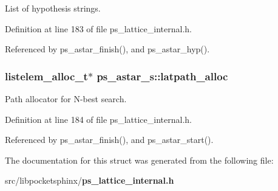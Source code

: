List of hypothesis strings. 



Definition at line 183 of file ps\+\_\+lattice\+\_\+internal.\+h.



Referenced by ps\+\_\+astar\+\_\+finish(), and ps\+\_\+astar\+\_\+hyp().

\subsubsection[{latpath\+\_\+alloc}]{\setlength{\rightskip}{0pt plus 5cm}listelem\+\_\+alloc\+\_\+t$\ast$ ps\+\_\+astar\+\_\+s\+::latpath\+\_\+alloc}\label{structps__astar__s_a754bce124cd92b1b2b6aa6dbbcd73cee}


Path allocator for N-\/best search. 



Definition at line 184 of file ps\+\_\+lattice\+\_\+internal.\+h.



Referenced by ps\+\_\+astar\+\_\+finish(), and ps\+\_\+astar\+\_\+start().



The documentation for this struct was generated from the following file\+:\begin{DoxyCompactItemize}
\item 
src/libpocketsphinx/{\bf ps\+\_\+lattice\+\_\+internal.\+h}\end{DoxyCompactItemize}
